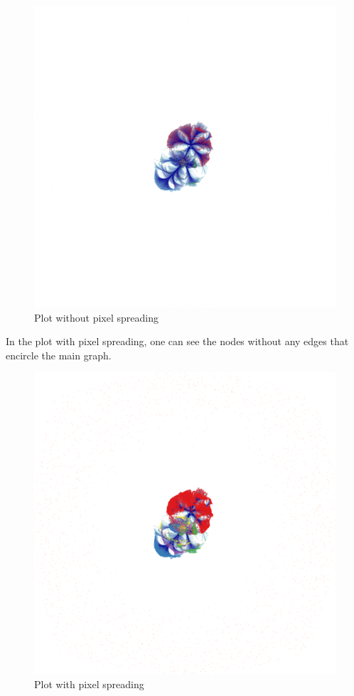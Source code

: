 \documentclass[12pt, a4paper]{article}
\begin{document}
\begin{figure}[H]
    \centering
    \includegraphics[width=\textwidth]{src/youtube/datashader/communities/datashader_comm_nospread}
    \caption{Plot without pixel spreading}
    \label{fig:youtube_ds_com_nospread}
\end{figure}

In the plot with pixel spreading, one can see the nodes without any edges that encircle the main graph.

\begin{figure}[H]
    \centering
    \includegraphics[width=\textwidth]{src/youtube/datashader/communities/datashader_comm_spread}
    \caption{Plot with pixel spreading}
    \label{fig:youtube_ds_com_spread}
\end{figure}
\end{document}
